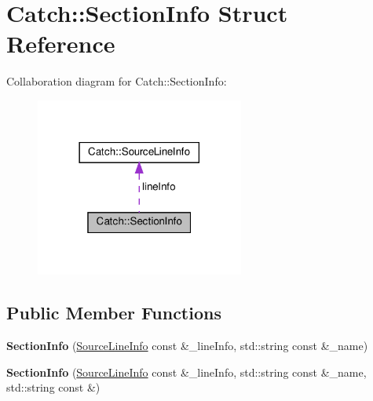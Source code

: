 \hypertarget{structCatch_1_1SectionInfo}{}\section{Catch\+:\+:Section\+Info Struct Reference}
\label{structCatch_1_1SectionInfo}


Collaboration diagram for Catch\+:\+:Section\+Info\+:
\nopagebreak
\begin{figure}[H]
\begin{center}
\leavevmode
\includegraphics[width=194pt]{structCatch_1_1SectionInfo__coll__graph}
\end{center}
\end{figure}
\subsection*{Public Member Functions}
\begin{DoxyCompactItemize}
\item 
\mbox{\label{structCatch_1_1SectionInfo_a2808437ae7d4bc0830cee1c3995165a6}} 
{\bfseries Section\+Info} (\hyperlink{structCatch_1_1SourceLineInfo}{Source\+Line\+Info} const \&\+\_\+line\+Info, std\+::string const \&\+\_\+name)
\item 
\mbox{\label{structCatch_1_1SectionInfo_a139875f2e7bd12a5898a948f8bad15b3}} 
{\bfseries Section\+Info} (\hyperlink{structCatch_1_1SourceLineInfo}{Source\+Line\+Info} const \&\+\_\+line\+Info, std\+::string const \&\+\_\+name, std\+::string const \&)
\end{DoxyCompactItemize}
